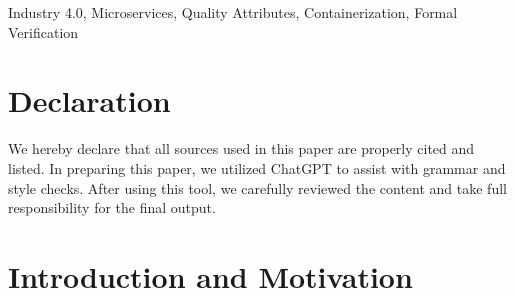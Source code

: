 \documentclass[conference]{IEEEtran}
\begin{document}
\maketitle
\IEEEpubidadjcol
\begin{abstract}

    


The juice manufacturing industry is evolving by integrating Industry 4.0 technologies, aiming to optimize production through intelligent automation. This report presents the design and development of a software architecture tailored for Industry 4.0 machinery in juice production. The proposed architecture ensures 24/7 operational efficiency, scalability, and real-time adaptability. Our approach focuses on the integration of multiple programming languages, databases, and messaging protocols, utilizing microservice-based architectural styles. Through formal verification and validation, we demonstrate the architecture's ability to meet quality attributes such as performance and availability. The results highlight the implementation of continuous production flow with reduced downtime and increased efficiency in juice manufacturing.

\end{abstract}

\begin{IEEEkeywords}
Industry 4.0, Microservices, Quality Attributes, Containerization, Formal Verification
\end{IEEEkeywords}

\section*{Declaration}
    We hereby declare that all sources used in this paper are properly cited and listed. In preparing this paper, we utilized ChatGPT to assist with grammar and style checks. After using this tool, we carefully reviewed the content and take full responsibility for the final output.


\section{Introduction and Motivation}
\color{blue}

\end{document}
